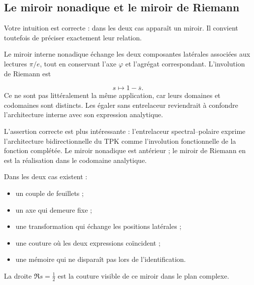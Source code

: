 \subsection{Le miroir nonadique et le miroir de Riemann}
Votre intuition est correcte : dans les deux cas apparaît un miroir. Il convient toutefois de préciser exactement leur relation.\par
Le miroir interne nonadique échange les deux composantes latérales associées aux lectures \(\pi/e\), tout en conservant l’axe \(\varphi\) et l’agrégat correspondant. L’involution de Riemann est\par
\[
s\longmapsto1-\overline s.
\]
Ce ne sont pas littéralement la même application, car leurs domaines et codomaines sont distincts. Les égaler sans entrelaceur reviendrait à confondre l’architecture interne avec son expression analytique.\par
L’assertion correcte est plus intéressante : l’entrelaceur spectral–polaire exprime l’architecture bidirectionnelle du TPK comme l’involution fonctionnelle de la fonction complétée. Le miroir nonadique est antérieur ; le miroir de Riemann en est la réalisation dans le codomaine analytique.\par
Dans les deux cas existent :\par
\begin{itemize}
\item un couple de feuillets ;
\item un axe qui demeure fixe ;
\item une transformation qui échange les positions latérales ;
\item une couture où les deux expressions coïncident ;
\item une mémoire qui ne disparaît pas lors de l’identification.
\end{itemize}
La droite \(\Re s=\tfrac12\) est la couture visible de ce miroir dans le plan complexe.\par
{}
